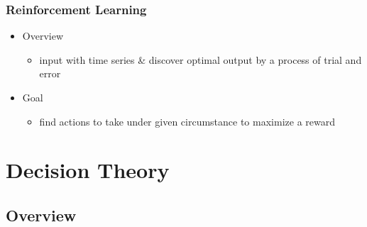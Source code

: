 \subsubsection{Reinforcement Learning}
\begin{itemize}
\item Overview
	\begin{itemize}
	\item input with time series \& discover optimal output by a process of trial and error
	\end{itemize}
\item Goal
	\begin{itemize}
	\item find actions to take under given circumstance to maximize a reward
	\end{itemize}
\end{itemize}

%

\section{Decision Theory}
\subsection{Overview}
